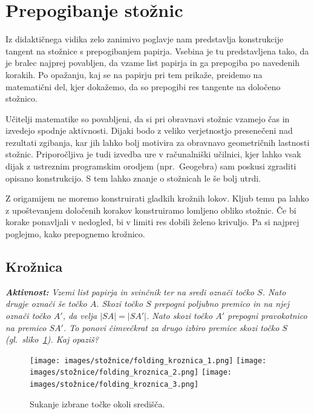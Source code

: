 \section{Prepogibanje stožnic}
\label{pogl:stoznice}

Iz didaktičnega vidika zelo zanimivo poglavje nam predstavlja konstrukcije tangent na stožnice s prepogibanjem papirja. Vsebina je tu predstavljena tako, da je bralec najprej povabljen, da vzame list papirja in ga prepogiba po navedenih korakih. Po opažanju, kaj se na papirju pri tem prikaže, preidemo na matematični del, kjer dokažemo, da so prepogibi res tangente na določeno stožnico.

Učitelji matematike so povabljeni, da si pri obravnavi stožnic vzamejo čas in izvedejo spodnje aktivnosti. Dijaki bodo z veliko verjetnostjo presenečeni nad rezultati zgibanja, kar jih lahko bolj motivira za obravnavo geometričnih lastnosti stožnic. Priporočljiva je tudi izvedba ure v računalniški učilnici, kjer lahko vsak dijak z ustreznim programskim orodjem (npr.\ Geogebra) sam poskusi zgraditi opisano konstrukcijo. S tem lahko znanje o stožnicah le še bolj utrdi.

Z origamijem ne moremo konstruirati gladkih krožnih lokov. Kljub temu pa lahko z upoštevanjem določenih korakov konstruiramo lomljeno obliko stožnic. Če bi korake ponavljali v nedogled, bi v limiti res dobili želeno krivuljo. Pa si najprej poglejmo, kako prepognemo krožnico.

\subsection{Krožnica}


\textit{\textbf{Aktivnost:} Vzemi list papirja in svinčnik ter na sredi označi točko $S$. Nato drugje označi še točko $A$. Skozi točko $S$ prepogni poljubno premico in na njej označi točko $A'$, da velja $|SA| = |SA'|$. Nato skozi točko $A'$ prepogni pravokotnico na premico $SA'$. To ponovi čimvečkrat za drugo izbiro premice skozi točko $S$ (gl.\ sliko~\ref{fig:koraki_kroznica}). Kaj opaziš?}

\begin{figure}[h]
    \centering
    \texttt{[image: images/stožnice/folding\_kroznica\_1.png]}
    \texttt{[image: images/stožnice/folding\_kroznica\_2.png]}
    \texttt{[image: images/stožnice/folding\_kroznica\_3.png]}
    \caption[Prepogibanje krožnice]{Sukanje izbrane točke okoli središča.}
    \label{fig:koraki_kroznica}
\end{figure}

